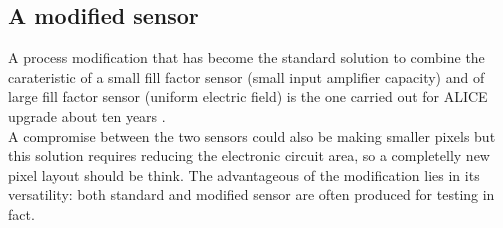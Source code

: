    \subsection{A modified sensor}
      A process modification that has become the standard solution to combine the carateristic of a small fill factor sensor (small input amplifier capacity) and of large fill factor sensor (uniform electric field) is the one carried out for ALICE upgrade about ten years \cite{AProcessModification}.\\
      A compromise between the two sensors could also be making smaller pixels but this solution requires reducing the electronic circuit area, so a completelly new pixel layout should be think. The advantageous of the modification lies in its versatility: both standard and modified sensor are often produced for testing in fact.

